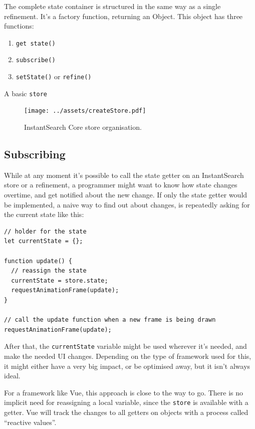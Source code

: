 The complete state container is structured in the same way as a single refinement. It's a factory function, returning an Object. This object has three functions: 

\begin{enumerate}
  \item {\tt get state()}
  \item {\tt subscribe()}
  \item {\tt setState()} or {\tt refine()}
\end{enumerate}

A basic {\tt store}

\begin{figure}[H]
\label{figure:createstore_inheritance}
  \centering
  \texttt{[image: ../assets/createStore.pdf]}
  \caption{InstantSearch Core store organisation.}
\end{figure}

\subsection{Subscribing}
\label{ssec:Subscribing}

While at any moment it's possible to call the state getter on an InstantSearch store or a refinement, a programmer might want to know how state changes overtime, and get notified about the new change. If only the state getter would be implemented, a naive way to find out about changes, is repeatedly asking for the current state like this:

\begin{lstlisting}[caption={Naive way to find out about changed state},label={lst:is-core-naive-subscribe}]
// holder for the state
let currentState = {};

function update() {
  // reassign the state
  currentState = store.state;
  requestAnimationFrame(update);
}

// call the update function when a new frame is being drawn
requestAnimationFrame(update);
\end{lstlisting}

After that, the {\tt currentState} variable might be used wherever it's needed, and make the needed UI changes. Depending on the type of framework used for this, it might either have a very big impact, or be optimised away, but it isn't always ideal.

For a framework like Vue\cite{vue-site}, this approach is close to the way to go. There is no implicit need for reassigning a local variable, since the {\tt store} is available with a getter. Vue will track the changes to all getters on objects with a process called ``reactive values''.

